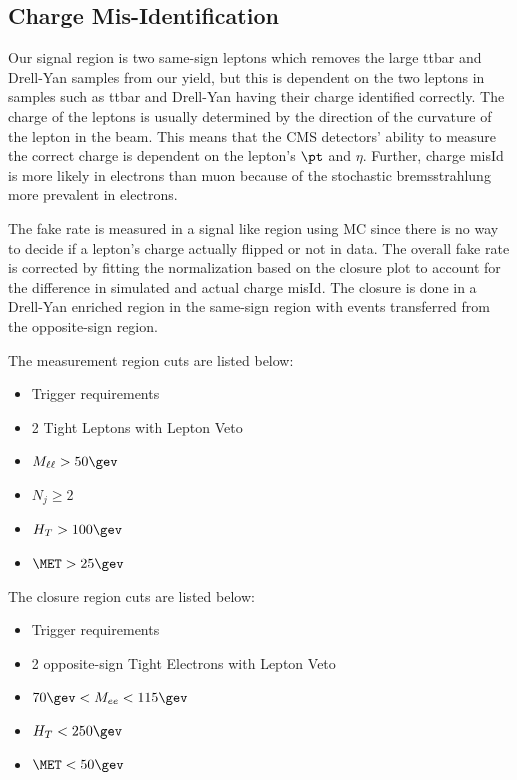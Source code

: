 \subsection{Charge Mis-Identification}\label{sec:charge_misId}
Our signal region is two same-sign leptons which removes the large ttbar and Drell-Yan samples from our yield, but this is dependent on the two leptons in samples such as ttbar and Drell-Yan having their charge identified correctly. The charge of the leptons is usually determined by the direction of the curvature of the lepton in the beam. This means that the CMS detectors' ability to measure the correct charge is dependent on the lepton's $\pt$ and $\eta$. Further, charge misId is more likely in electrons than muon because of the stochastic bremsstrahlung more prevalent in electrons.

The fake rate is measured in a signal like region using MC since there is no way to decide if a lepton's charge actually flipped or not in data. The overall fake rate is corrected by fitting the normalization based on the closure plot to account for the difference in simulated and actual charge misId. The closure is done in a Drell-Yan enriched region in the same-sign region with events transferred from the opposite-sign region.

The measurement region cuts are listed below:

\begin{itemize}
  \item Trigger requirements
  \item 2 Tight Leptons with Lepton Veto
  \item $M_{\ell\ell} > 50\gev$
  \item $N_{j} \ge 2$
  \item $H_{T} > 100\gev$
  \item $\MET > 25\gev$
\end{itemize}

The closure region cuts are listed below:

\begin{itemize}
  \item Trigger requirements
  \item 2 opposite-sign Tight Electrons with Lepton Veto
  \item $70\gev < M_{ee} < 115\gev$
  \item $H_{T} < 250\gev$
  \item $\MET < 50\gev$
\end{itemize}

% 

